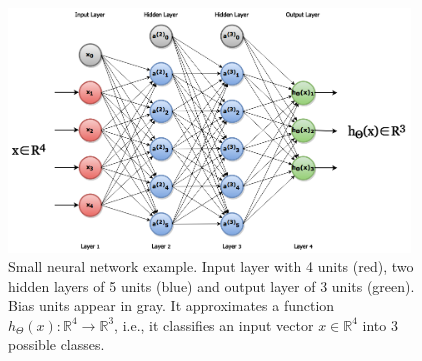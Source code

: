 \begin{figure}[h]
	\centering
	\includegraphics[width = 0.95\textwidth]{plots/neuralNetwork.png}
	\caption[Example of an Artificial Neural Network]{Small neural network example. Input layer with 4 units (red), two hidden layers of 5 units (blue) and output layer of 3 units (green). Bias units appear in gray. It approximates a function $h_\Theta(x): \mathbb{R}^4 \to \mathbb{R}^3$, i.e., it classifies an input vector $x \in \mathbb{R}^4$ into 3 possible classes.}
	\label{fig:NeuralNetwork}
\end{figure}

